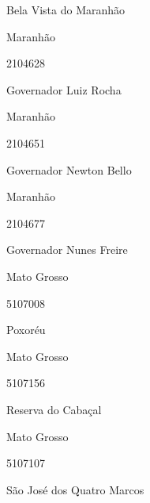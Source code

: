 \documentclass[
  letterpaper,
]{report}
\begin{document}
Bela Vista do Maranhão

\n    

\n    

\n      

Maranhão

\n      

2104628

\n      

Governador Luiz Rocha

\n    

\n    

\n      

Maranhão

\n      

2104651

\n      

Governador Newton Bello

\n    

\n    

\n      

Maranhão

\n      

2104677

\n      

Governador Nunes Freire

\n    

\n    

\n      

Mato Grosso

\n      

5107008

\n      

Poxoréu

\n    

\n    

\n      

Mato Grosso

\n      

5107156

\n      

Reserva do Cabaçal

\n    

\n    

\n      

Mato Grosso

\n      

5107107

\n      

São José dos Quatro Marcos

\n    

\n    
\end{document}
